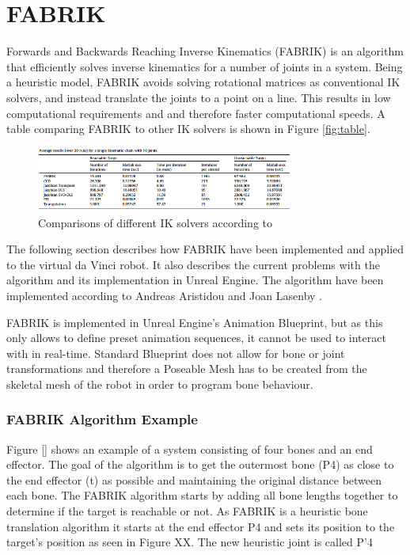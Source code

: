 \chapter*{FABRIK}

Forwards and Backwards Reaching Inverse Kinematics (FABRIK) is an algorithm that efficiently solves inverse kinematics for a number of joints in a system. Being a heuristic model, FABRIK avoids solving rotational matrices as conventional IK solvers, and instead translate the joints to a point on a line. This results in low computational requirements and and therefore faster computational speeds. A table comparing FABRIK to other IK solvers is shown in Figure \autoref{fig:table}. 

\begin{figure}[H]
\centering
\includegraphics[width=0.75\textwidth]{fabrik/table}
\caption{Comparisons of different IK solvers according to}
\label{fig:table}
\end{figure}


The following section describes how FABRIK have been implemented and applied to the virtual da Vinci robot. It also describes the current problems with the algorithm and its implementation in Unreal Engine. 
The algorithm have been implemented according to Andreas Aristidou and Joan Lasenby \citep{}. 

FABRIK is implemented in Unreal Engine's Animation Blueprint, but as this only allows to define preset animation sequences, it cannot be used to interact with in real-time. Standard Blueprint does not allow for bone or joint transformations and therefore a Poseable Mesh has to be created from the skeletal mesh of the robot in order to program bone behaviour. 

\subsection*{FABRIK Algorithm Example}

Figure \ref{} shows an example of a system consisting of four bones and an end effector. The goal of the algorithm is to get the outermost bone (P4) as close to the end effector (t) as possible and maintaining the original distance between each bone. 
The FABRIK algorithm starts by adding all bone lengths together to determine if the target is reachable or not. 
As FABRIK is a heuristic bone translation algorithm it starts at the end effector P4 and sets its position to the target's position as seen in Figure XX. The new heuristic joint is called P'4 

